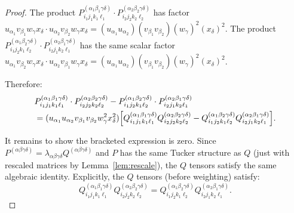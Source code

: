\documentclass[12pt]{article}
\theoremstyle{definition}
\begin{document}
\begin{proof}
The product $P^{(\alpha_1\beta_1\gamma\delta)}_{i_1j_1k_1\ell_1} \cdot P^{(\alpha_2\beta_2\gamma\delta)}_{i_2j_2k_2\ell_2}$ has factor $u_{\alpha_1}v_{\beta_1}w_\gamma x_\delta \cdot u_{\alpha_2}v_{\beta_2}w_\gamma x_\delta = (u_{\alpha_1}u_{\alpha_2})(v_{\beta_1}v_{\beta_2})(w_\gamma)^2(x_\delta)^2$. The product $P^{(\alpha_1\beta_2\gamma\delta)}_{i_1j_2k_1\ell_2} \cdot P^{(\alpha_2\beta_1\gamma\delta)}_{i_2j_1k_2\ell_1}$ has the same scalar factor $u_{\alpha_1}v_{\beta_2}w_\gamma x_\delta \cdot u_{\alpha_2}v_{\beta_1}w_\gamma x_\delta = (u_{\alpha_1}u_{\alpha_2})(v_{\beta_1}v_{\beta_2})(w_\gamma)^2(x_\delta)^2$.

Therefore:
\begin{align*}
&P^{(\alpha_1\beta_1\gamma\delta)}_{i_1j_1k_1\ell_1} \cdot P^{(\alpha_2\beta_2\gamma\delta)}_{i_2j_2k_2\ell_2} - P^{(\alpha_1\beta_2\gamma\delta)}_{i_1j_2k_1\ell_2} \cdot P^{(\alpha_2\beta_1\gamma\delta)}_{i_2j_1k_2\ell_1} \\
&= (u_{\alpha_1}u_{\alpha_2}v_{\beta_1}v_{\beta_2}w_\gamma^2 x_\delta^2)\Bigl[Q^{(\alpha_1\beta_1\gamma\delta)}_{i_1j_1k_1\ell_1}Q^{(\alpha_2\beta_2\gamma\delta)}_{i_2j_2k_2\ell_2} - Q^{(\alpha_1\beta_2\gamma\delta)}_{i_1j_2k_1\ell_2}Q^{(\alpha_2\beta_1\gamma\delta)}_{i_2j_1k_2\ell_1}\Bigr].
\end{align*}

It remains to show the bracketed expression is zero. Since $P^{(\alpha\beta\gamma\delta)} = \lambda_{\alpha\beta\gamma\delta}Q^{(\alpha\beta\gamma\delta)}$ and $P$ has the same Tucker structure as $Q$ (just with rescaled matrices by Lemma~\ref{lem:rescale}), the $Q$ tensors satisfy the same algebraic identity. Explicitly, the $Q$ tensors (before weighting) satisfy:
\begin{equation}\label{eq:Qidentity}
Q^{(\alpha_1\beta_1\gamma\delta)}_{i_1j_1k_1\ell_1}Q^{(\alpha_2\beta_2\gamma\delta)}_{i_2j_2k_2\ell_2} = Q^{(\alpha_1\beta_2\gamma\delta)}_{i_1j_2k_1\ell_2}Q^{(\alpha_2\beta_1\gamma\delta)}_{i_2j_1k_2\ell_1}.
\end{equation}


\end{proof}
\end{document}
